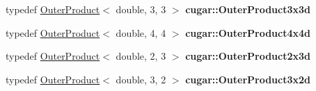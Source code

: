 \begin{DoxyCompactItemize}
typedef \hyperlink{structcugar_1_1_outer_product}{Outer\+Product}$<$ double, 3, 3 $>$ {\bfseries cugar\+::\+Outer\+Product3x3d}
\item 
\mbox{\label{group___matrices_module_ga2669aea827df2ec555cfd0f4b5b25893}} 
typedef \hyperlink{structcugar_1_1_outer_product}{Outer\+Product}$<$ double, 4, 4 $>$ {\bfseries cugar\+::\+Outer\+Product4x4d}
\item 
\mbox{\label{group___matrices_module_gaa4e541a8f9f4694fc69536bed620c66a}} 
typedef \hyperlink{structcugar_1_1_outer_product}{Outer\+Product}$<$ double, 2, 3 $>$ {\bfseries cugar\+::\+Outer\+Product2x3d}
\item 
\mbox{\label{group___matrices_module_gaf4f872073ad67bbd3cfc5c2876175f83}} 
typedef \hyperlink{structcugar_1_1_outer_product}{Outer\+Product}$<$ double, 3, 2 $>$ {\bfseries cugar\+::\+Outer\+Product3x2d}
\end{DoxyCompactItemize}
